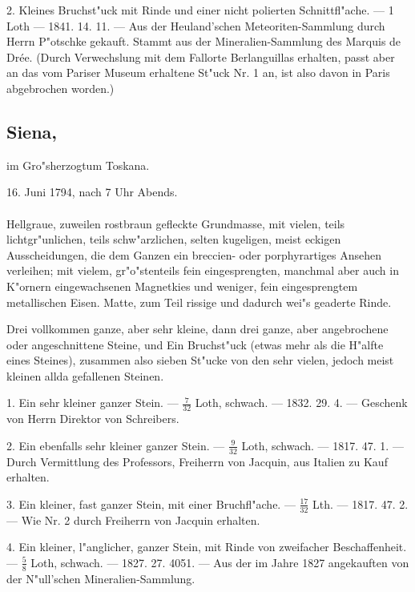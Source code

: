 \documentclass[a4paper, 11pt, oneside, polutonikogreek, german]{article}
\begin{document}
2. Kleines Bruchst"uck mit Rinde und einer nicht polierten Schnittfl"ache. --- 1 Loth --- 1841. 14. 11. --- Aus der Heuland'schen Meteoriten-Sammlung durch Herrn P"otschke gekauft. Stammt aus der Mineralien-Sammlung des Marquis de Drée. (Durch Verwechslung mit dem Fallorte Berlanguillas erhalten, passt aber an das vom Pariser Museum erhaltene St"uck Nr. 1 an, ist also davon in Paris abgebrochen worden.)
\subsection[Siena.]{Siena,}
\begin{center}
\small
im Gro"sherzogtum Toskana.

16. Juni 1794, nach 7 Uhr Abends.
\end{center}
\paragraph{}
Hellgraue, zuweilen rostbraun gefleckte Grundmasse, mit vielen, teils lichtgr"unlichen, teils schw"arzlichen, selten kugeligen, meist eckigen Ausscheidungen, die dem Ganzen ein breccien- oder porphyrartiges Ansehen verleihen; mit vielem, gr"o"stenteils fein eingesprengten, manchmal aber auch in K"ornern eingewachsenen Magnetkies und weniger, fein eingesprengtem metallischen Eisen. Matte, zum Teil rissige und dadurch wei"s geaderte Rinde.

Drei vollkommen ganze, aber sehr kleine, dann drei ganze, aber angebrochene oder angeschnittene Steine, und Ein Bruchst"uck (etwas mehr als die H"alfte eines Steines), zusammen also sieben St"ucke von den sehr vielen, jedoch meist kleinen allda gefallenen Steinen.

1. Ein sehr kleiner ganzer Stein. --- $\frac{7}{32}$ Loth, schwach. --- 1832. 29. 4. --- Geschenk von Herrn Direktor von Schreibers.

2. Ein ebenfalls sehr kleiner ganzer Stein. --- $\frac{9}{32}$ Loth, schwach. --- 1817. 47. 1. --- Durch Vermittlung des Professors, Freiherrn von Jacquin, aus Italien zu Kauf erhalten.

3. Ein kleiner, fast ganzer Stein, mit einer Bruchfl"ache. --- $\frac{17}{32}$ Lth. --- 1817. 47. 2. --- Wie Nr. 2 durch Freiherrn von Jacquin erhalten.

4. Ein kleiner, l"anglicher, ganzer Stein, mit Rinde von zweifacher Beschaffenheit. --- $\frac{5}{8}$ Loth, schwach. --- 1827. 27. 4051. --- Aus der im Jahre 1827 angekauften von der N"ull'schen Mineralien-Sammlung.
\end{document}
